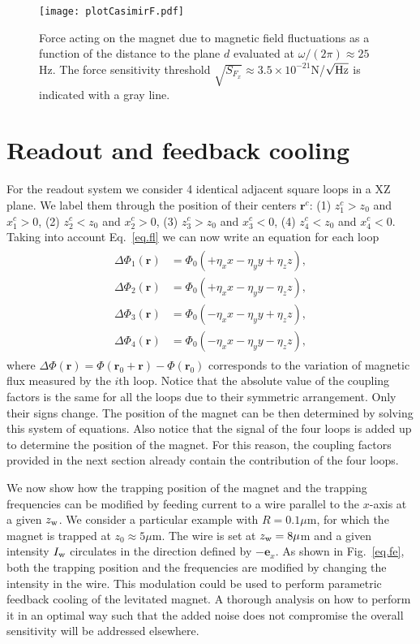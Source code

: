 \documentclass[twocolumn,superscriptaddress,floatfix,preprintnumbers,prl]{revtex4}
\begin{document}
\begin{figure}[t]
\begin{center}
\texttt{[image: plotCasimirF.pdf]}
\caption{ Force acting on the magnet due to magnetic field fluctuations as a function of the distance to the plane $d$ evaluated at $\omega/(2\pi)\approx 25$Hz. The force sensitivity threshold $\sqrt{S_{F_x}}\approx 3.5\times 10^{-21}$N/$\sqrt{\rm Hz}$ is indicated with a gray line. }
\label{fig.Cas}
\end{center}
\end{figure}

\section{Readout and feedback cooling}

For the readout system we consider 4 identical adjacent square loops in a XZ plane. We label them through the position of their centers $\mathbf{r}^c$: 
(1) $z^c_{1}>z_0$ and $x^c_{1}>0$, 
(2) $z^c_{2}<z_0$ and $x^c_{2}>0$,
(3) $z^c_{3}>z_0$ and $x^c_{3}<0$, 
(4) $z^c_{4}<z_0$ and $x^c_{4}<0$. 
Taking into account Eq.~\eqref{eq.fl} we can now write an equation for each loop
\begin{align}
\begin{split}
\Delta \Phi_1(\mathbf{r})&=\Phi_0  (+\eta_x x-\eta_y y+\eta_z z),\\
\Delta \Phi_2(\mathbf{r})&=\Phi_0  (+\eta_x x-\eta_y y-\eta_z z),\\
\Delta \Phi_3(\mathbf{r})&=\Phi_0  (-\eta_x x-\eta_y y+\eta_z z),\\
\Delta \Phi_4(\mathbf{r})&=\Phi_0  (-\eta_x x-\eta_y y-\eta_z z),
\end{split}
\end{align}
where $\Delta \Phi(\mathbf{r})=\Phi(\mathbf{r}_0+\mathbf{r})-\Phi(\mathbf{r}_0)$ corresponds to the variation of magnetic flux measured by the $i$th loop. Notice that the absolute value of the coupling factors is the same for all the loops due to their symmetric arrangement. Only their signs change. The position of the magnet can be then determined by solving this system of equations. Also notice that the signal of the four loops is added up to determine the position of the magnet. For this reason, the coupling factors provided in the next section already contain the contribution of the four loops.  

We now show how the trapping position of the magnet and the trapping frequencies can be modified by feeding current to a wire parallel to the $x$-axis at a given $z_{\rm w}$. We consider a particular example with $R=0.1\mu$m, for which the magnet is trapped at $z_0\approx 5\mu$m. The wire is set at $z_{\rm w}=8\mu$m and a given intensity $I_{\rm w}$ circulates in the direction defined by $-\mathbf{e}_x$. As shown in Fig.~\ref{eq.fe}, both the trapping position and the frequencies are modified by changing the intensity in the wire. This modulation could be used to perform parametric feedback cooling of the levitated magnet. A thorough analysis on how to perform it in an optimal way such that the added noise does not compromise the overall sensitivity will be addressed elsewhere.
\end{document}
